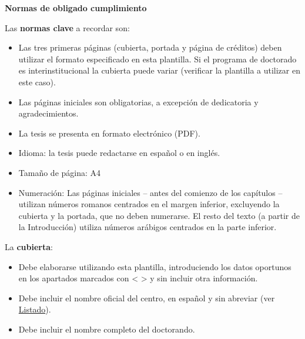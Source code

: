 \textbf{Normas de obligado cumplimiento}

Las \textbf{normas clave} a recordar son:
\begin{itemize}
    \item Las tres primeras páginas (cubierta, portada y página de créditos) deben utilizar el formato especificado en esta plantilla. Si el programa de doctorado es interinstitucional la cubierta puede variar (verificar la plantilla a utilizar en este caso).
    \item Las páginas iniciales son obligatorias, a excepción de dedicatoria y agradecimientos.
    \item La tesis se presenta en formato electrónico (PDF).
    \item Idioma: la tesis puede redactarse en español o en inglés.
    \item Tamaño de página: A4
    \item Numeración: Las páginas iniciales – antes del comienzo de los capítulos – utilizan números romanos centrados en el margen inferior, excluyendo la cubierta y la portada, que no deben numerarse. El resto del texto (a partir de la Introducción) utiliza números arábigos centrados en la parte inferior.
\end{itemize}

La \textbf{cubierta}:
\begin{itemize}
    \item Debe elaborarse utilizando esta plantilla, introduciendo los datos oportunos en los apartados marcados con < > y sin incluir otra información.
    \item Debe incluir el nombre oficial del centro, en español y sin abreviar (ver \href{https://www.upm.es/sfs/Rectorado/Vicerrectorado%20de%20Investigacion/Doctorado/Tesis/impresos/5_Listado%20de%20PD%20y%20sus%20centros.pdf}{Listado}).
    \item Debe incluir el nombre completo del doctorando.
\end{itemize}

